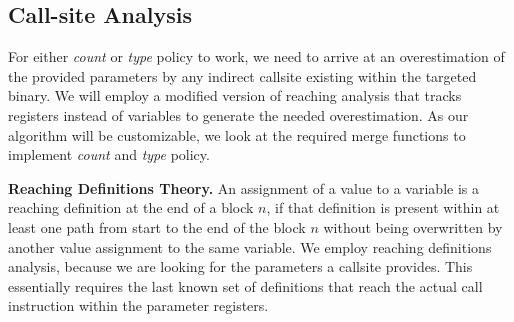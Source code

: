 \subsection{Call-site Analysis}
\label{section:callsiteanalysis}
For either \emph{count} or \emph{type} policy to work, we need to arrive at an overestimation of the provided parameters by any indirect 
callsite existing within the targeted binary. We will employ a modified version of reaching analysis that tracks registers instead of 
variables to generate the needed overestimation. As our algorithm will be customizable, we look at the required merge functions to 
implement \emph{count} and \emph{type} policy. 

\textbf{Reaching Definitions Theory.}
\label{subsection:reachindefinitionstheory}
An assignment of a value to a variable is a reaching definition at the end of a block $n$, if that definition is present within at 
least one path from start to the end of the block $n$ without being overwritten by another value assignment to the same variable. 
We employ reaching definitions analysis, because we are looking for the parameters a callsite provides. This essentially 
requires the last known set of definitions that reach the actual call instruction within the parameter registers.


